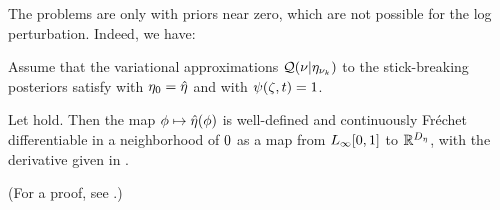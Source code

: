 
The problems are only with priors near zero, which are not possible for
the log perturbation.  Indeed, we have:


\begin{assu}
%
Assume that the variational approximations $\mathcal{Q}(\nu \vert \eta_{\nu_{k}})$ to the
stick-breaking posteriors satisfy  with $\eta_0 =
\hat\eta$ and with $\psi(\zeta, t) = 1$.
%
\end{assu}


\begin{thm}
%
Let  hold. Then the map $\phi \mapsto
\hat\eta(\phi)$ is well-defined and continuously Fr{\'e}chet differentiable in a
neighborhood of $0$ as a map from ${L_{\infty}[0,1]}$ to $\mathbb{R}^{D_{\eta}}$,
with the derivative given in .

(For a proof, see  .)
%

\end{thm}
%
